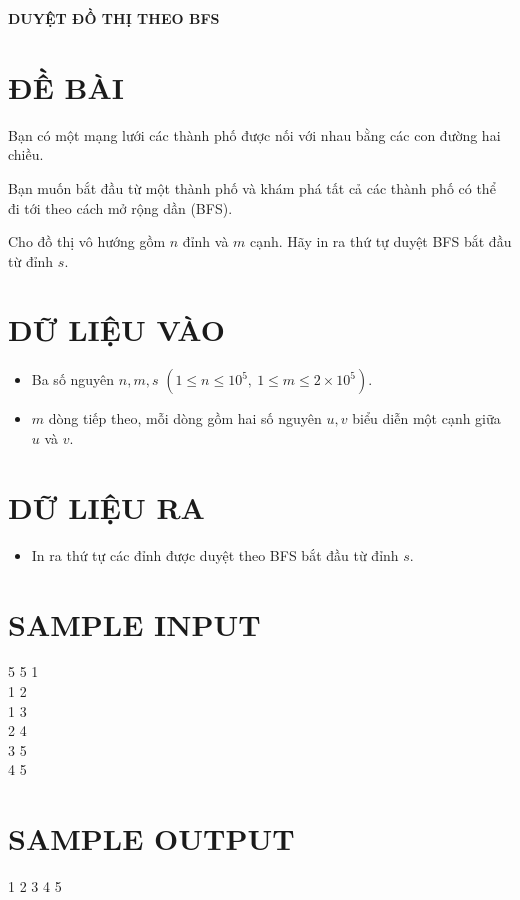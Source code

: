 \documentclass[a4paper,12pt]{article}
\begin{document}
\begin{center}
    \textbf{\Large DUYỆT ĐỒ THỊ THEO BFS}
\end{center}

\section*{ĐỀ BÀI}
Bạn có một mạng lưới các thành phố được nối với nhau bằng các con đường hai chiều.

Bạn muốn bắt đầu từ một thành phố và khám phá tất cả các thành phố có thể đi tới theo cách mở rộng dần (BFS).

Cho đồ thị vô hướng gồm $n$ đỉnh và $m$ cạnh. Hãy in ra thứ tự duyệt BFS bắt đầu từ đỉnh $s$.

\section*{DỮ LIỆU VÀO}
\begin{itemize}
    \item Ba số nguyên $n, m, s$ $(1 \le n \le 10^5,\ 1 \le m \le 2 \times 10^5)$.
    \item $m$ dòng tiếp theo, mỗi dòng gồm hai số nguyên $u, v$ biểu diễn một cạnh giữa $u$ và $v$.
\end{itemize}

\section*{DỮ LIỆU RA}
\begin{itemize}
    \item In ra thứ tự các đỉnh được duyệt theo BFS bắt đầu từ đỉnh $s$.
\end{itemize}

\section*{SAMPLE INPUT}
\begin{tcolorbox}
5 5 1 \\
1 2 \\
1 3 \\
2 4 \\
3 5 \\
4 5
\end{tcolorbox}

\section*{SAMPLE OUTPUT}
\begin{tcolorbox}
1 2 3 4 5
\end{tcolorbox}
\end{document}
